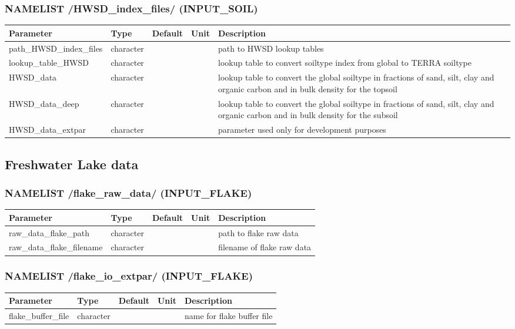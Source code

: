 \documentclass[a4paper,10pt,DIV14,BCOR1cm,titlepage,twoside]{scrartcl}
\providecommand{\tabularnewline}{\\}
\begin{document}
\subsubsection*{NAMELIST /HWSD\_index\_files/ (INPUT\_SOIL)}
\begin{longtable}{|p{4cm}|p{1.5cm}|p{1.5cm}|p{1cm}|p{6cm}|}
\hline 
\textbf{Parameter}& \textbf{Type}& \textbf{Default}& \textbf{Unit}& \textbf{Description}
\tabularnewline
\hline
\endhead
\hline
path\_HWSD\_index\_files & character & &  & path to HWSD lookup tables
\tabularnewline
\hline 
lookup\_table\_HWSD & character & &  & lookup table to convert soiltype index from global to TERRA soiltype 
\tabularnewline
\hline
HWSD\_data & character & &  & lookup table to convert the global soiltype in fractions of sand, silt, clay and organic carbon and in bulk density for the topsoil 
\tabularnewline
\hline
HWSD\_data\_deep & character & &  & lookup table to convert the global soiltype in fractions of sand, silt, clay and organic carbon and in bulk density for the subsoil 
\tabularnewline
\hline
HWSD\_data\_extpar & character & & & parameter used only for development purposes   
\tabularnewline
\hline
\bottomrule
\end{longtable}

\subsection{Freshwater Lake data}\label{namelist_input_for_extpar_flake}

\subsubsection*{NAMELIST /flake\_raw\_data/ (INPUT\_FLAKE)}

\begin{longtable}{|p{4cm}|p{1.5cm}|p{1.5cm}|p{1cm}|p{6cm}|}
\hline 
\textbf{Parameter}& \textbf{Type}& \textbf{Default}& \textbf{Unit}& \textbf{Description}
\tabularnewline
\hline
\endhead
\hline 
raw\_data\_flake\_path & character & &  & path to flake raw data \tabularnewline
\hline 
raw\_data\_flake\_filename & character & &  & filename of flake raw data \tabularnewline
\hline
\bottomrule
\end{longtable}

\subsubsection*{NAMELIST /flake\_io\_extpar/ (INPUT\_FLAKE)}
\begin{longtable}{|p{4cm}|p{1.5cm}|p{1.5cm}|p{1cm}|p{6cm}|}
\hline 
\textbf{Parameter}& \textbf{Type}& \textbf{Default}& \textbf{Unit}& \textbf{Description}
\tabularnewline
\hline
\endhead
\hline
flake\_buffer\_file & character & &  & name for flake buffer file
\tabularnewline
\bottomrule
\end{longtable}
\end{document}
